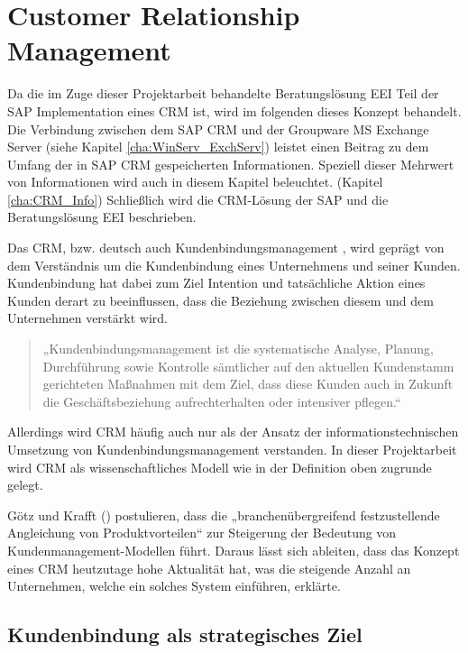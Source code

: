 \chapter{Customer Relationship Management}
\label{cha:Customer Relationship Management}
Da die im Zuge dieser Projektarbeit behandelte Beratungslösung \ac{EEI} Teil der SAP Implementation eines \ac{CRM} ist, wird im folgenden dieses Konzept behandelt. Die Verbindung zwischen dem SAP \ac{CRM} und der Groupware \ac{MS} Exchange Server (siehe Kapitel \ref{cha:WinServ_ExchServ}) leistet einen Beitrag zu dem Umfang der in SAP \ac{CRM} gespeicherten Informationen. Speziell dieser Mehrwert von Informationen wird auch in diesem Kapitel beleuchtet. (Kapitel \ref{cha:CRM_Info}) Schließlich wird die \ac{CRM}-Lösung der SAP und die Beratungslösung \ac{EEI} beschrieben.

Das \ac{CRM}, bzw. deutsch auch Kundenbindungsmanagement \cite[S.7]{Homburg.2013}, wird geprägt von dem Verständnis um die Kundenbindung eines Unternehmens und seiner Kunden. Kundenbindung hat dabei zum Ziel Intention und tatsächliche Aktion eines Kunden derart zu beeinflussen, dass die Beziehung zwischen diesem und dem Unternehmen verstärkt wird. \cite[S.81-94]{Diller.1996}

\begin{quotation} 
	„Kundenbindungsmanagement ist die systematische Analyse, Planung, Durchführung sowie Kontrolle sämtlicher auf den aktuellen Kundenstamm gerichteten Maßnahmen mit dem Ziel, dass diese Kunden auch in Zukunft die Geschäftsbeziehung aufrechterhalten oder intensiver pflegen.“ 
	
	\cite[S.8]{Homburg.2013}
\end{quotation} 

Allerdings wird \ac{CRM} häufig auch nur als der Ansatz der informationstechnischen Umsetzung von Kundenbindungsmanagement verstanden. \cite[S.3]{Bach.2000} In dieser Projektarbeit wird \ac{CRM} als wissenschaftliches Modell wie in der Definition oben zugrunde gelegt.

Götz und Krafft (\citeyear[S.581]{Gotz.2013}) postulieren, dass die „branchenübergreifend festzustellende Angleichung von Produktvorteilen“ zur Steigerung der Bedeutung von Kundenmanagement-Modellen führt. Daraus lässt sich ableiten, dass das Konzept eines \ac{CRM} heutzutage hohe Aktualität hat, was die steigende Anzahl an Unternehmen, welche ein solches System einführen, erklärte.

\section{Kundenbindung als strategisches Ziel}

